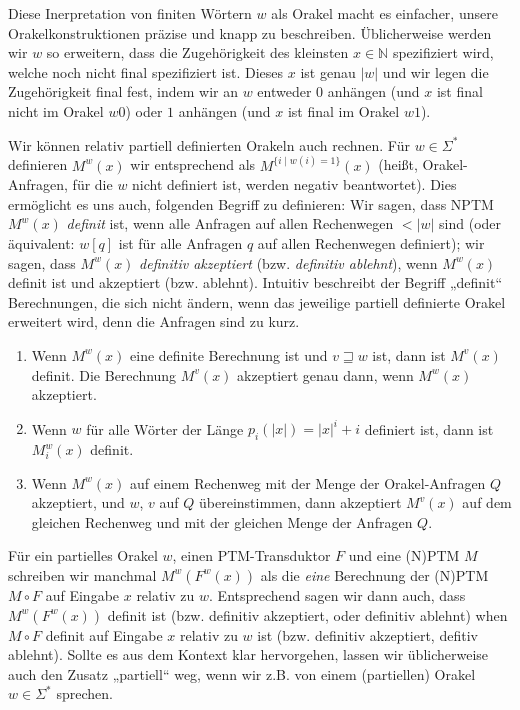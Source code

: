 Diese Inerpretation von finiten Wörtern $w$ als Orakel macht es einfacher, unsere Orakelkonstruktionen präzise und knapp zu beschreiben. Üblicherweise werden wir $w$ so erweitern, dass die Zugehörigkeit des kleinsten $x\in\mathbb N$ spezifiziert wird, welche noch nicht final spezifiziert ist. Dieses $x$ ist genau $|w|$ und wir legen die Zugehörigkeit final fest, indem wir an $w$ entweder $0$ anhängen (und $x$ ist final nicht im Orakel $w0$) oder $1$ anhängen (und $x$ ist final im Orakel $w1$).


Wir können relativ partiell definierten Orakeln auch rechnen. Für $w\in\Sigma^*$ definieren $M^w(x)$ wir entsprechend als $M^{\{i\mid w(i)=1\}}(x)$ (heißt, Orakel-Anfragen, für die $w$ nicht definiert ist, werden negativ beantwortet).
Dies ermöglicht es uns auch, folgenden Begriff zu definieren: Wir sagen, dass NPTM $M^w(x)$ \emph{definit} ist, wenn alle Anfragen auf allen Rechenwegen $<|w|$ sind (oder äquivalent: $w[q]$ ist für alle Anfragen $q$ auf allen Rechenwegen definiert); wir sagen, dass $M^w(x)$ \emph{definitiv akzeptiert} (bzw. \emph{definitiv ablehnt}), wenn $M^w(x)$ definit ist und akzeptiert (bzw. ablehnt). Intuitiv beschreibt der Begriff „definit“ Berechnungen, die sich nicht ändern, wenn das jeweilige partiell definierte Orakel erweitert wird, denn die Anfragen sind zu kurz.
\begin{observation}\label{obs:partialoracles}
    \begin{enumerate}
        \item Wenn $M^w(x)$ eine definite Berechnung ist und $v\sqsupseteq w$ ist, dann ist $M^v(x)$ definit. Die Berechnung $M^v(x)$ akzeptiert genau dann, wenn $M^w(x)$ akzeptiert.
        \item Wenn $w$ für alle Wörter der Länge $p_i(|x|)=|x|^i+i$ definiert ist, dann ist $M_i^w(x)$ definit.
        \item Wenn $M^w(x)$ auf einem Rechenweg mit der Menge der Orakel-Anfragen $Q$ akzeptiert, und $w$, $v$ auf $Q$ übereinstimmen, dann akzeptiert $M^v(x)$ auf dem gleichen Rechenweg und mit der gleichen Menge der Anfragen $Q$.
    \end{enumerate}
\end{observation}

Für ein partielles Orakel $w$, einen PTM-Transduktor $F$ und eine (N)PTM $M$ schreiben wir manchmal $M^w(F^w(x))$ als die \emph{eine} Berechnung der (N)PTM $M\circ F$ auf Eingabe $x$ relativ zu $w$.
Entsprechend sagen wir dann auch, dass $M^w(F^w(x))$ definit ist (bzw. definitiv akzeptiert, oder definitiv ablehnt) when $M\circ F$ definit auf Eingabe $x$ relativ zu $w$ ist (bzw. definitiv akzeptiert, defitiv ablehnt).
Sollte es aus dem Kontext klar hervorgehen, lassen wir üblicherweise auch den Zusatz „partiell“ weg, wenn wir z.B. von einem (partiellen) Orakel $w\in\Sigma^*$ sprechen.

